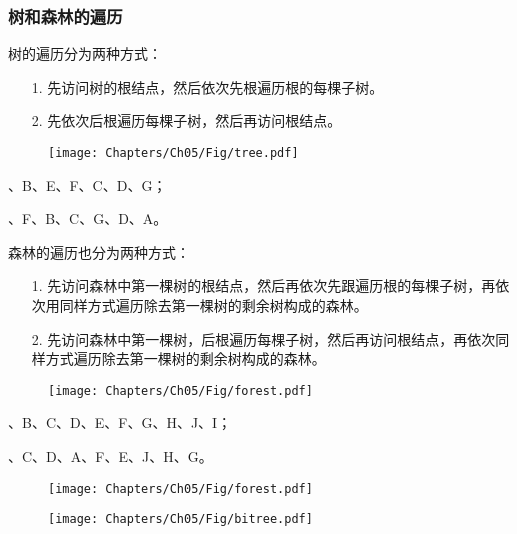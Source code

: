 \subsubsection{树和森林的遍历}
\begin{frame}\ft{\subsubsecname}
  树的遍历分为两种方式：
  \begin{itemize}
  \item[1.] 先访问树的根结点，然后依次先根遍历根的每棵子树。
  \item[2.] 先依次后根遍历每棵子树，然后再访问根结点。
  \end{itemize}

  \begin{figure}
    \centering
    \texttt{[image: Chapters/Ch05/Fig/tree.pdf]}
  \end{figure}

  、B、E、F、C、D、G；

  、F、B、C、G、D、A。
\end{frame}

\begin{frame}\ft{\subsubsecname}
  森林的遍历也分为两种方式：
  \begin{itemize}
  \item[1.] 先访问森林中第一棵树的根结点，然后再依次先跟遍历根的每棵子树，再依次用同样方式遍历除去第一棵树的剩余树构成的森林。
  \item[2.] 先访问森林中第一棵树，后根遍历每棵子树，然后再访问根结点，再依次同样方式遍历除去第一棵树的剩余树构成的森林。
  \end{itemize}

  \begin{figure}
    \centering
    \texttt{[image: Chapters/Ch05/Fig/forest.pdf]}
  \end{figure}

  、B、C、D、E、F、G、H、J、I；

  、C、D、A、F、E、J、H、G。
\end{frame}

\begin{frame}\ft{\subsubsecname}
  \begin{figure}
    \centering
    \begin{minipage}{0.45\textwidth}
      \texttt{[image: Chapters/Ch05/Fig/forest.pdf]}  
    \end{minipage}
    \begin{minipage}{0.45\textwidth}
      \texttt{[image: Chapters/Ch05/Fig/bitree.pdf]}  
    \end{minipage}    
  \end{figure}
\end{frame}
